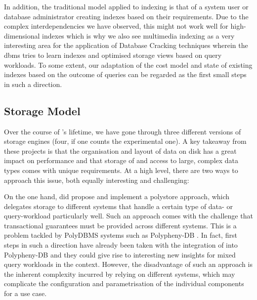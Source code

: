 In addition, the traditional model applied to indexing is that of a system user or database administrator creating indexes based on their requirements. Due to the complex interdependencies we have observed, this might not work well for high-dimensional indexes which is why we also see multimedia indexing as a very interesting area for the application of Database Cracking techniques \cite{Idreos:2007Database,Schuhknecht:2013Uncracked} wherein the \acrshort{dbms} tries to learn indexes and optimised storage views based on query workloads. To some extent, our adaptation of the cost model and state of existing indexes based on the outcome of queries can be regarded as the first small steps in such a direction.

\subsection{Storage Model}
Over the course of \cottontail{}'s lifetime, we have gone through three different versions of storage engines (four, if one counts the experimental one). A key takeaway from these projects is that the organisation and layout of data on disk has a great impact on performance and that storage of and access to large, complex data types comes with unique requirements. At a high level, there are two ways to approach this issue, both equally interesting and challenging:

On the one hand, \cite{Giangreco:2018Database} did propose and implement a polystore approach, which delegates storage to different systems that handle a certain type of data- or query-workload particularly well. Such an approach comes with the challenge that transactional guarantees must be provided across different systems. This is a problem tackled by PolyDBMS \cite{Vogt:2021Polystore} systems such as Polypheny-DB \cite{Vogt:2018Polypheny,Vogt:2020Polypheny}. In fact, first steps in such a direction have already been taken with the integration of \cottontail{} into Polypheny-DB and they could give rise to interesting new insights for mixed query workloads in the \vitrivr{} context. However, the disadvantage of such an approach is the inherent complexity incurred by relying on different systems, which may complicate the configuration and parametrisation of the individual components for a use case.

